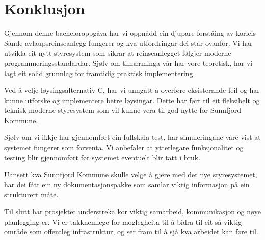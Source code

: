 \chapter{Konklusjon}
\thispagestyle{fancy}

Gjennom denne bacheloroppgåva har vi oppnådd ein djupare forståing av korleis Sande avlaupsreinseanlegg fungerer og kva utfordringar dei står ovanfor. 
Vi har utvikla eit nytt styresystem som sikrar at reinseanlegget følgjer moderne programmeringsstandardar. 
Sjølv om tilnærminga vår har vore teoretisk, har vi lagt eit solid grunnlag for framtidig praktisk implementering.

Ved å velje løysingsalternativ C, har vi unngått å overføre eksisterande feil og har kunne utforske og implementere betre løysingar. 
Dette har ført til eit fleksibelt og teknisk moderne styresystem som vil kunne vera til god nytte for \gls{Sunnfjord Kommune}.

Sjølv om vi ikkje har gjennomført ein fullskala test, har simuleringane våre vist at systemet fungerer som forventa. 
Vi anbefaler at ytterlegare funksjonalitet og testing blir gjennomført før systemet eventuelt blir tatt i bruk.

Uansett kva \gls{Sunnfjord Kommune} skulle velge å gjere med det nye styresystemet, har dei fått ein ny dokumentasjonspakke 
som samlar viktig informasjon på ein strukturert måte. 

Til slutt har prosjektet understreka kor viktig samarbeid, kommunikasjon og nøye planlegging er.
Vi er takknemlege for moglegheita til å bidra til eit så viktig område som offentleg infrastruktur, og ser fram til å sjå kva arbeidet kan føre til.